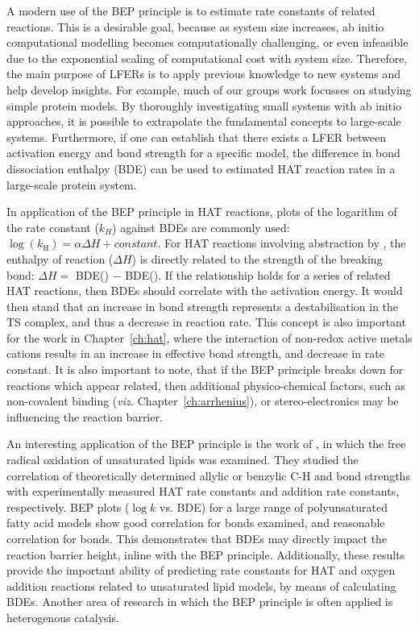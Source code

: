 A modern use of the BEP principle is to estimate rate constants of related reactions. This is a desirable goal, because as system size increases, ab initio computational modelling becomes computationally challenging, or even infeasible due to the exponential scaling of computational cost with system size. Therefore, the main purpose of LFERs is to apply previous knowledge to new systems and help develop insights. For example, much of our groups work focusses on studying simple protein models. By thoroughly investigating small systems with ab initio approaches, it is possible to extrapolate the fundamental concepts to large-scale systems. Furthermore, if one can establish that there exists a LFER between activation energy and bond strength for a specific model, the difference in bond dissociation enthalpy (BDE) can be used to estimated HAT reaction rates in a large-scale protein system.

In application of the BEP principle in HAT reactions, plots of the logarithm of the rate constant ($k_H$) against BDEs are commonly used: $\log(k_\mathrm{H}) = \alpha \Delta H + constant$. For HAT reactions involving abstraction by \cumo, the enthalpy of reaction ($\Delta H$) is directly related to the strength of the breaking bond: $\Delta H =$ BDE() $-$ BDE(). If the relationship holds for a series of related HAT reactions, then BDEs should correlate with the activation energy. It would then stand that an increase in bond strength represents a destabilisation in the TS complex, and thus a decrease in reaction rate. This concept is also important for the work in Chapter~\ref{ch:hat}, where the interaction of non-redox active metals cations results in an increase in effective bond strength, and decrease in rate constant. It is also important to note, that if the BEP principle breaks down for reactions which appear related, then additional physico-chemical factors, such as non-covalent binding (\emph{viz.} Chapter~\ref{ch:arrhenius}), or stereo-electronics may be influencing the reaction barrier.

An interesting application of the BEP principle is the work of \citet{Pratt2003}, in which the free radical oxidation of unsaturated lipids was examined. They studied the correlation of theoretically determined allylic or benzylic C-H and  bond strengths with experimentally measured HAT rate constants and  addition rate constants, respectively. BEP plots ($\log k$ vs. BDE) for a large range of polyunsaturated fatty acid models show good correlation for  bonds examined, and reasonable correlation for  bonds. This demonstrates that BDEs may directly impact the reaction barrier height, inline with the BEP principle. Additionally, these results provide the important ability of predicting rate constants for HAT and oxygen addition reactions related to unsaturated lipid models, by means of calculating BDEs. Another area of research in which the BEP principle is often applied is heterogenous catalysis.\cite{Panov2015}


